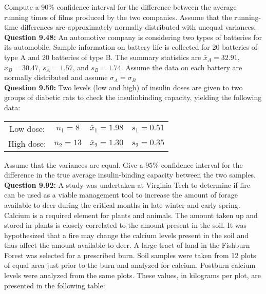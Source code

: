 \documentclass{article}
\begin{document}
Compute a 90\% confidence interval for the difference
between the average running times of films produced by
the two companies. Assume that the running-time 
differences are approximately normally distributed with
unequal variances.\\\newline
\textbf{Question 9.48:}
An automotive company is considering two
types of batteries for its automobile. Sample information 
on battery life is collected for 20 batteries of
type A and 20 batteries of type B. The summary
statistics are $\bar{x}_A = 32.91$, $\bar{x}_B = 30.47$, $s_A = 1.57$,
and $s_B = 1.74$. Assume the data on each battery are
normally distributed and assume $\sigma_A = \sigma_B$\\\newline
\textbf{Question 9.50:}
Two levels (low and high) of insulin doses are
given to two groups of diabetic rats to check the 
insulinbinding capacity, yielding the following data:
\begin{center}
\begin{tabular}{c c c c}
    Low dose: & $n_1 = 8$ & $\bar{x}_1 = 1.98$ & $s_1 = 0.51$ \\
    High dose: & $n_2 = 13$ & $\bar{x}_2 = 1.30$ & $s_2 = 0.35$
\end{tabular}
\end{center}
Assume that the variances are equal. Give a 95\% 
confidence interval for the difference in the true average
insulin-binding capacity between the two samples.\\\newline
\textbf{Question 9.92:}
A study was undertaken at Virginia Tech to determine if 
fire can be used as a viable management tool to increase 
the amount of forage available to deer during the critical 
months in late winter and early spring. Calcium is a 
required element for plants and animals. The amount taken 
up and stored in plants is closely correlated to the amount 
present in the soil. It was hypothesized that a fire may 
change the calcium levels present in the soil and thus 
affect the amount available to deer. A large tract of land 
in the Fishburn Forest was selected for a prescribed burn. 
Soil samples were taken from 12 plots of equal area just 
prior to the burn and analyzed for calcium. Postburn 
calcium levels were analyzed from the same plots. These 
values, in kilograms per plot, are presented in the 
following table:
\end{document}
